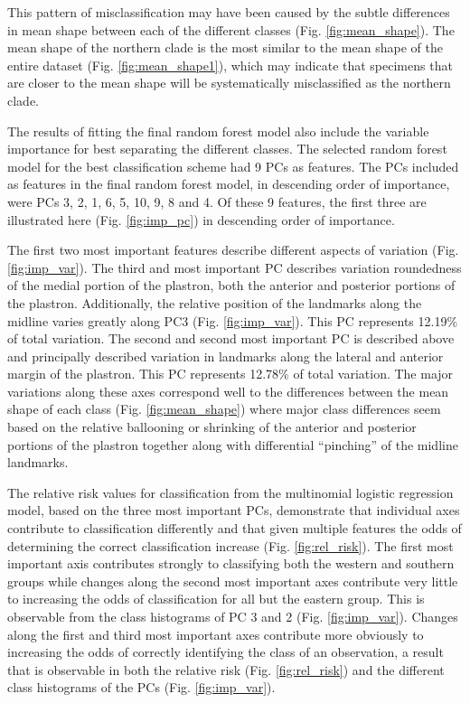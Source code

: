 \documentclass[12pt,letterpaper]{article}\usepackage{graphicx, color}
\begin{document}
This pattern of misclassification may have been caused by the subtle differences in mean shape between each of the different classes (Fig. \ref{fig:mean_shape}). The mean shape of the northern clade is the most similar to the mean shape of the entire dataset (Fig. \ref{fig:mean_shape1}), which may indicate that specimens that are closer to the mean shape will be systematically misclassified as the northern clade.



The results of fitting the final random forest model also include the variable importance for best separating the different classes. The selected random forest model for the best classification scheme had 9 PCs as features. The PCs included as features in the final random forest model, in descending order of importance, were PCs 3, 2, 1, 6, 5, 10, 9, 8 and 4. Of these 9 features, the first three are illustrated here (Fig. \ref{fig:imp_pc}) in descending order of importance. 


The first two most important features describe different aspects of variation (Fig. \ref{fig:imp_var}). The third and most important PC describes variation roundedness of the medial portion of the plastron, both the anterior and posterior portions of the plastron. Additionally, the relative position of the landmarks along the midline varies greatly along PC3 (Fig. \ref{fig:imp_var}). This PC represents 12.19\% of total variation. The second and second most important PC is described above and principally described variation in landmarks along the lateral and anterior margin of the plastron. This PC represents 12.78\% of total variation. The major variations along these axes correspond well to the differences between the mean shape of each class (Fig. \ref{fig:mean_shape}) where major class differences seem based on the relative ballooning or shrinking of the anterior and posterior portions of the plastron together along with differential ``pinching'' of the midline landmarks.

The relative risk values for classification from the multinomial logistic regression model, based on the three most important PCs, demonstrate that individual axes contribute to classification differently and that given multiple features the odds of determining the correct classification increase (Fig. \ref{fig:rel_risk}). The first most important axis contributes strongly to classifying both the western and southern groups while changes along the second most important axes contribute very little to increasing the odds of classification for all but the eastern group. This is observable from the class histograms of PC 3 and 2 (Fig. \ref{fig:imp_var}). Changes along the first and third most important axes contribute more obviously to increasing the odds of correctly identifying the class of an observation, a result that is observable in both the relative risk (Fig. \ref{fig:rel_risk}) and the different class histograms of the PCs (Fig. \ref{fig:imp_var}).
\end{document}
